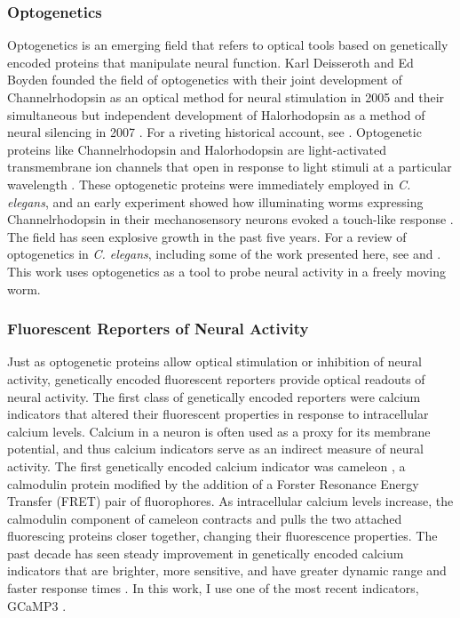 \subsubsection{Optogenetics}
Optogenetics is an emerging field that refers to optical tools based on genetically encoded proteins that manipulate neural function. Karl Deisseroth and Ed Boyden founded the field of optogenetics with their joint development of Channelrhodopsin as an optical method for neural stimulation in  2005 \citep{boyden_millisecond-timescale_2005} and their simultaneous but independent development of Halorhodopsin as a method of neural silencing in 2007 \citep{zhang_multimodal_2007, han_multiple-color_2007}.  For a riveting historical account, see \citep{boyden_history_2011}. Optogenetic proteins like Channelrhodopsin and Halorhodopsin are light-activated transmembrane ion channels that open in response to light stimuli at a particular wavelength \citep{nagel_channelrhodopsin-2_2003, yizhar_optogenetics_2011, fenno_development_2011}. These optogenetic proteins were immediately employed  in \textit{C. elegans}, and an early experiment showed how illuminating worms expressing Channelrhodopsin in their mechanosensory neurons evoked a touch-like response  \citep{nagel_light_2005}.  The field has seen explosive growth in the past five years. For a review of optogenetics in \textit{C. elegans}, including some of the work presented here, see \citep{xu_early_2011} and \citep{yizhar_optogenetics_2011}. This work uses optogenetics as a tool to probe neural activity in a freely moving worm. 

\subsubsection{Fluorescent Reporters of Neural Activity}
Just as optogenetic proteins allow optical stimulation or inhibition of neural activity,  genetically encoded fluorescent reporters provide optical readouts of neural activity.  The first class of genetically encoded reporters were calcium indicators that altered their fluorescent properties in response to intracellular calcium levels. Calcium in a neuron is often used as a proxy for its membrane potential, and thus calcium indicators serve as an indirect measure of neural activity.   The first genetically encoded calcium indicator was cameleon \citep{miyawaki_fluorescent_1997}, a calmodulin protein modified by the addition of a Forster Resonance Energy Transfer (FRET) pair of fluorophores. As intracellular calcium levels increase, the calmodulin component of  cameleon contracts and pulls the two attached fluorescing proteins closer together, changing their fluorescence properties. The past decade has seen  steady improvement in genetically encoded calcium indicators that are brighter, more sensitive, and have greater dynamic range and faster response times \citep{miyawaki_innovations_2005,mank_genetically_2008,yamada_quantitative_2011}. In this work, I use one of the most recent indicators, GCaMP3 \citep{tian_imaging_2009}.
 
